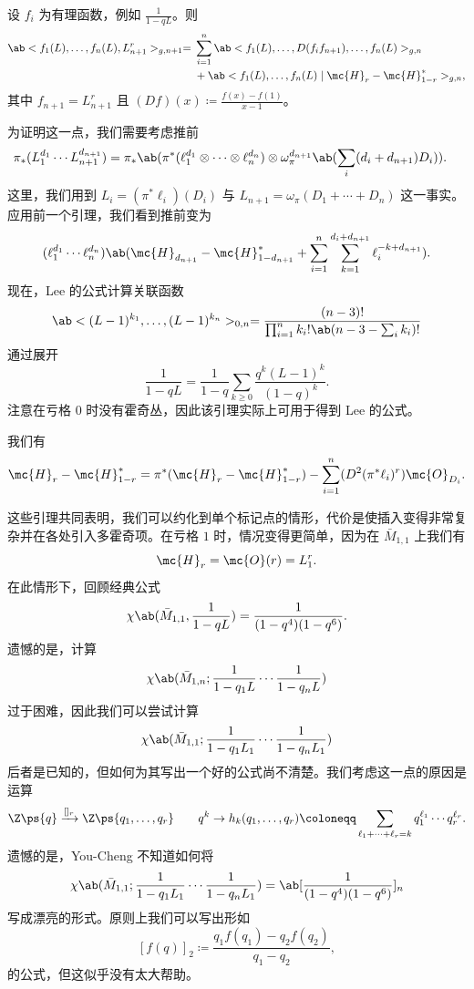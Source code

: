 \begin{lem}
    设 \(f_i\) 为有理函数，例如 \(\frac{1}{1-q L}\)。则
    \begin{align*}
        \ab<f_1(L), \ldots, f_n(L), L_{n+1}^r>_{g, n+1} ={}& \sum_{i=1}^n \ab<f_1(L), \ldots, D(f_i f_{n+1}), \ldots, f_n(L)>_{g, n} \\
        &+ \ab<f_1(L), \ldots, f_n(L) \mid \mc{H}_r - \mc{H}_{1-r}^*>_{g,n},
    \end{align*}
    其中 \(f_{n+1} = L_{n+1}^r\) 且 \((Df)(x) \coloneqq \frac{f(x)-f(1)}{x-1}\)。
\end{lem}

为证明这一点，我们需要考虑推前
\begin{align*}
    \pi_* (L_1^{d_1} \cdots L_{n+1}^{d_{n+1}}) &= \pi_* \ab(\pi^*(\ell_1^{d_1} \otimes \cdots \otimes \ell_n^{d_n}) \otimes \omega_{\pi}^{d_{n+1}}\ab(\sum_i (d_i+d_{n+1})D_i)).
\end{align*}
这里，我们用到 \(L_i = (\pi^* \ell_i)(D_i)\) 与 \(L_{n+1} = \omega_{\pi}(D_1 + \cdots + D_n)\) 这一事实。应用前一个引理，我们看到推前变为
\[ (\ell_1^{d_1} \cdots \ell_n^{d_n})\ab(\mc{H}_{d_{n+1}} - \mc{H}_{1-d_{n+1}}^* + \sum_{i=1}^n \sum_{k=1}^{d_i + d_{n+1}} \ell_i^{-k+d_{n+1}}). \]
现在，Lee 的公式计算关联函数
\[ \ab<(L-1)^{k_1}, \ldots, (L-1)^{k_n}>_{0,n} = \frac{(n-3)!}{\prod_{i=1}^n k_i! \ab(n-3-\sum_i k_i)!} \]
通过展开
\[ \frac{1}{1-qL} = \frac{1}{1-q} \sum_{k \geq 0} \frac{q^k(L-1)^k}{(1-q)^k}. \]
注意在亏格 \(0\) 时没有霍奇丛，因此该引理实际上可用于得到 Lee 的公式。

\begin{lem}
    我们有
    \[ \mc{H}_r - \mc{H}_{1-r}^* = \pi^* (\mc{H}_r - \mc{H}_{1-r}^*) - \sum_{i=1}^n (D^2 (\pi^* \ell_i)^r) \mc{O}_{D_i}. \]
\end{lem}

这些引理共同表明，我们可以约化到单个标记点的情形，代价是使插入变得非常复杂并在各处引入多霍奇项。在亏格 \(1\) 时，情况变得更简单，因为在 \(\bar{M}_{1,1}\) 上我们有
\[ \mc{H}_r = \mc{O}(r) = L_1^r. \]
在此情形下，回顾经典公式
\[ \chi\ab(\bar{M}_{1,1}, \frac{1}{1-qL}) = \frac{1}{(1-q^4)(1-q^6)}. \]
遗憾的是，计算
\[ \chi\ab(\bar{M}_{1,n}; \frac{1}{1-q_1 L} \cdots \frac{1}{1-q_n L}) \]
过于困难，因此我们可以尝试计算
\[ \chi\ab(\bar{M}_{1,1}; \frac{1}{1-q_1 L_1} \cdots \frac{1}{1-q_n L_1})  \]
后者是已知的，但如何为其写出一个好的公式尚不清楚。我们考虑这一点的原因是运算
\[ \Z\ps{q} \xrightarrow{[]_r} \Z\ps{q_1, \ldots, q_r} \qquad q^k \to h_k(q_1, \ldots, q_r) \coloneqq \sum_{\ell_1 + \cdots + \ell_r = k} q_1^{\ell_1} \cdots q_r^{\ell_r}. \]
遗憾的是，You-Cheng 不知道如何将
\[ \chi\ab(\bar{M}_{1,1}; \frac{1}{1-q_1 L_1} \cdots \frac{1}{1-q_n L_1}) = \ab[\frac{1}{(1-q^4)(1-q^6)}]_n \]
写成漂亮的形式。原则上我们可以写出形如
\[ [f(q)]_2 \coloneqq \frac{q_1 f(q_1) - q_2 f(q_2)}{q_1 - q_2}, \]
的公式，但这似乎没有太大帮助。

